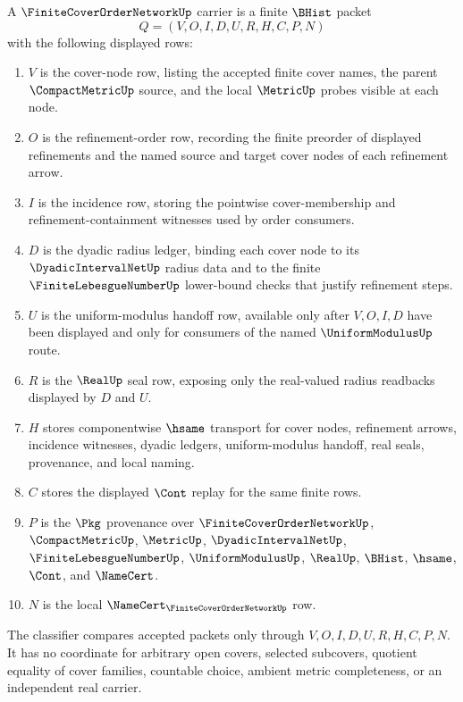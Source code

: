 \begin{definition}
\label{def:finite-cover-order-network-carrier}
A $\FiniteCoverOrderNetworkUp$ carrier is a finite $\BHist$ packet
$$
Q=(V,O,I,D,U,R,H,C,P,N)
$$
with the following displayed rows:
\begin{enumerate}
\item $V$ is the cover-node row, listing the accepted finite cover names, the parent $\CompactMetricUp$ source, and the local $\MetricUp$ probes visible at each node.
\item $O$ is the refinement-order row, recording the finite preorder of displayed refinements and the named source and target cover nodes of each refinement arrow.
\item $I$ is the incidence row, storing the pointwise cover-membership and refinement-containment witnesses used by order consumers.
\item $D$ is the dyadic radius ledger, binding each cover node to its $\DyadicIntervalNetUp$ radius data and to the finite $\FiniteLebesgueNumberUp$ lower-bound checks that justify refinement steps.
\item $U$ is the uniform-modulus handoff row, available only after $V,O,I,D$ have been displayed and only for consumers of the named $\UniformModulusUp$ route.
\item $R$ is the $\RealUp$ seal row, exposing only the real-valued radius readbacks displayed by $D$ and $U$.
\item $H$ stores componentwise $\hsame$ transport for cover nodes, refinement arrows, incidence witnesses, dyadic ledgers, uniform-modulus handoff, real seals, provenance, and local naming.
\item $C$ stores the displayed $\Cont$ replay for the same finite rows.
\item $P$ is the $\Pkg$ provenance over $\FiniteCoverOrderNetworkUp$, $\CompactMetricUp$, $\MetricUp$, $\DyadicIntervalNetUp$, $\FiniteLebesgueNumberUp$, $\UniformModulusUp$, $\RealUp$, $\BHist$, $\hsame$, $\Cont$, and $\NameCert$.
\item $N$ is the local $\NameCert_{\FiniteCoverOrderNetworkUp}$ row.
\end{enumerate}
The classifier compares accepted packets only through $V,O,I,D,U,R,H,C,P,N$. It has no coordinate for arbitrary open covers, selected subcovers, quotient equality of cover families, countable choice, ambient metric completeness, or an independent real carrier.
\end{definition}

